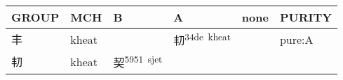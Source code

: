 \documentclass[14pt,a4paper]{scrartcl}
\begin{document}
\begin{longtable}[c]{@{}llllll@{}}
\toprule
\begin{minipage}[b]{0.14\columnwidth}\raggedright\strut
GROUP
\strut\end{minipage} &
\begin{minipage}[b]{0.14\columnwidth}\raggedright\strut
MCH
\strut\end{minipage} &
\begin{minipage}[b]{0.14\columnwidth}\raggedright\strut
B
\strut\end{minipage} &
\begin{minipage}[b]{0.14\columnwidth}\raggedright\strut
A
\strut\end{minipage} &
\begin{minipage}[b]{0.14\columnwidth}\raggedright\strut
none
\strut\end{minipage} &
\begin{minipage}[b]{0.14\columnwidth}\raggedright\strut
PURITY
\strut\end{minipage}\tabularnewline
\midrule
\endhead
\begin{minipage}[t]{0.14\columnwidth}\raggedright\strut
丰
\strut\end{minipage} &
\begin{minipage}[t]{0.14\columnwidth}\raggedright\strut
kheat
\strut\end{minipage} &
\begin{minipage}[t]{0.14\columnwidth}\raggedright\strut
\strut\end{minipage} &
\begin{minipage}[t]{0.14\columnwidth}\raggedright\strut
㓞\textsuperscript{34de~kheat}
\strut\end{minipage} &
\begin{minipage}[t]{0.14\columnwidth}\raggedright\strut
\strut\end{minipage} &
\begin{minipage}[t]{0.14\columnwidth}\raggedright\strut
pure:A
\strut\end{minipage}\tabularnewline
\begin{minipage}[t]{0.14\columnwidth}\raggedright\strut
㓞
\strut\end{minipage} &
\begin{minipage}[t]{0.14\columnwidth}\raggedright\strut
kheat
\strut\end{minipage} &
\begin{minipage}[t]{0.14\columnwidth}\raggedright\strut
契\textsuperscript{5951~sjet}
\strut\end{minipage} &

\end{longtable}
\end{document}

